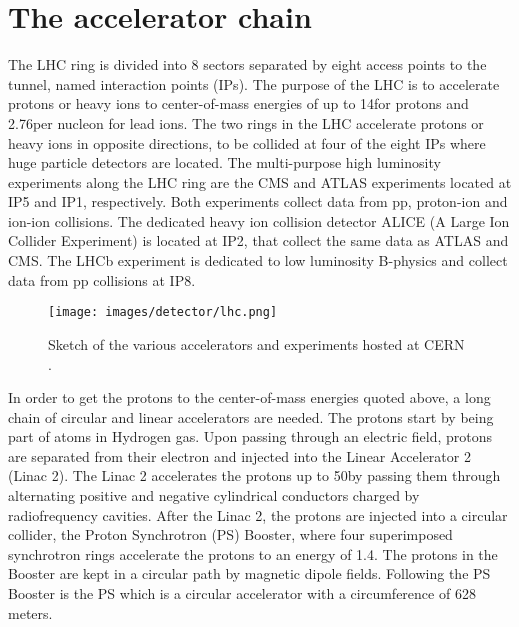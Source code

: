 \section{The accelerator chain}
\noindent\justify
The LHC ring is divided into 8 sectors separated by eight access points to the tunnel, named interaction points (IPs). 
The purpose of the LHC is to accelerate protons or heavy ions to center-of-mass energies of up to 14\TeV for protons and 2.76\TeV per nucleon for lead ions. 
The two rings in the LHC accelerate protons or heavy ions in opposite directions, to be collided at four of the eight IPs where huge particle detectors are located.
The multi-purpose high luminosity experiments along the LHC ring are the CMS \cite{Chatrchyan:2008aa} and ATLAS\cite{Armstrong:1994it} experiments located at IP5 and IP1, respectively. 
Both experiments collect data from pp, proton-ion and ion-ion collisions.
The dedicated heavy ion collision detector ALICE (A Large Ion Collider Experiment) \cite{alice} is located at IP2, that collect the same data as ATLAS and CMS. 
The LHCb \cite{CERN-LHCC-98-004} experiment is dedicated to low luminosity B-physics and collect data from pp collisions at IP8.                                  
\noindent
\justify
\begin{figure}[!htp]
  \centering
   \texttt{[image: images/detector/lhc.png]}
   \caption{Sketch of the various accelerators and experiments hosted at CERN \cite{Haffner:1621894}.}
   \label{fig:LHC}
\end{figure}                                                                                                                                                                                    
In order to get the protons to the center-of-mass energies quoted above, a long chain of circular and linear accelerators are needed. 
The protons start by being part of atoms in Hydrogen gas. 
Upon passing through an electric field, protons are separated from their electron and injected into the Linear Accelerator 2 (Linac 2). 
The Linac 2 accelerates the protons up to 50\MeV by passing them through alternating positive and negative cylindrical conductors charged by radiofrequency cavities. 
After the Linac 2, the protons are injected into a circular collider, the Proton Synchrotron (PS) Booster, where four superimposed synchrotron rings accelerate the protons to an energy of 1.4\GeV. 
The protons in the Booster are kept in a circular path by magnetic dipole fields.
Following the PS Booster is the PS which is a circular accelerator with a circumference of 628 meters. 
